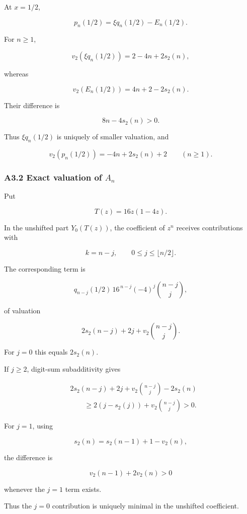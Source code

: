 \documentclass[
  10pt,
  letterpaper,
]{article}
\theoremstyle{definition}
\theoremstyle{remark}
\begin{document}
At \(x=1/2\),

\[
p_n(1/2)=\xi q_n(1/2)-E_n(1/2).
\]

For \(n\ge1\),

\[
v_2(\xi q_n(1/2))
=
2-4n+2s_2(n),
\]

whereas

\[
v_2(E_n(1/2))
=
4n+2-2s_2(n).
\]

Their difference is

\[
8n-4s_2(n)>0.
\]

Thus \(\xi q_n(1/2)\) is uniquely of smaller valuation, and

\[
\boxed{
v_2(p_n(1/2))
=
-4n+2s_2(n)+2
\qquad(n\ge1).
}
\tag{A17}
\]

\subsubsection{\texorpdfstring{A3.2 Exact valuation of
\(A_n\)}{A3.2 Exact valuation of A\_n}}\label{a3.2-exact-valuation-of-a_n}

Put

\[
T(z)=16z(1-4z).
\]

In the unshifted part \(Y_0(T(z))\), the coefficient of \(z^n\) receives
contributions with

\[
k=n-j,
\qquad
0\le j\le \lfloor n/2\rfloor.
\]

The corresponding term is

\[
q_{n-j}(1/2)\,
16^{\,n-j}
(-4)^j
\binom{n-j}{j},
\]

of valuation

\[
2s_2(n-j)+2j+v_2\binom{n-j}{j}.
\tag{A18}
\]

For \(j=0\) this equals \(2s_2(n)\).

If \(j\ge2\), digit-sum subadditivity gives

\[
\begin{aligned}
&2s_2(n-j)+2j+v_2\binom{n-j}{j}
-2s_2(n)
\\
&\qquad\ge
2(j-s_2(j))
+
v_2\binom{n-j}{j}
>0.
\end{aligned}
\]

For \(j=1\), using

\[
s_2(n)=s_2(n-1)+1-v_2(n),
\]

the difference is

\[
v_2(n-1)+2v_2(n)>0
\]

whenever the \(j=1\) term exists.

Thus the \(j=0\) contribution is uniquely minimal in the unshifted
coefficient.
\end{document}
